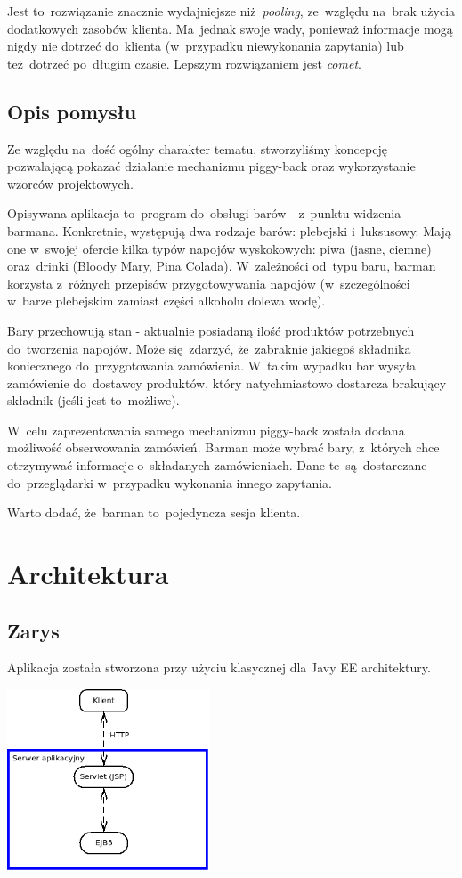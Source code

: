 \documentclass[11pt]{aghdpl}
\begin{document}
Jest to~rozwiązanie znacznie wydajniejsze niż~\textit{pooling}, ze~względu na~brak użycia dodatkowych zasobów klienta. Ma~jednak swoje wady, ponieważ informacje mogą nigdy nie dotrzeć do~klienta (w~przypadku niewykonania zapytania) lub też~dotrzeć po~długim czasie. Lepszym rozwiązaniem jest \textit{comet}.

\section{Opis pomysłu}
Ze względu na~dość ogólny charakter tematu, stworzyliśmy koncepcję pozwalającą pokazać działanie mechanizmu piggy-back oraz wykorzystanie wzorców projektowych.

Opisywana aplikacja to~program do~obsługi barów - z~punktu widzenia barmana. Konkretnie, występują dwa rodzaje barów: plebejski i~luksusowy. Mają one w~swojej ofercie kilka typów napojów wyskokowych: piwa (jasne, ciemne) oraz~drinki (Bloody Mary, Pina Colada). W~zależności od~typu baru, barman korzysta z~różnych przepisów przygotowywania napojów (w~szczególności w~barze plebejskim zamiast części alkoholu dolewa wodę). 

Bary przechowują stan - aktualnie posiadaną ilość produktów potrzebnych do~tworzenia napojów. Może się~zdarzyć, że~zabraknie jakiegoś składnika koniecznego do~przygotowania zamówienia. W~takim wypadku bar wysyła zamówienie do~dostawcy produktów, który natychmiastowo dostarcza brakujący składnik (jeśli jest to~możliwe). 

W~celu zaprezentowania samego mechanizmu piggy-back została dodana możliwość obserwowania zamówień. Barman może wybrać bary, z~których chce otrzymywać informacje o~składanych zamówieniach. Dane te~są~dostarczane do~przeglądarki w~przypadku wykonania innego zapytania.

Warto dodać, że~barman to~pojedyncza sesja klienta.
\chapter{Architektura}
\section{Zarys}
Aplikacja została stworzona przy użyciu klasycznej dla Javy EE architektury.

\begin{center}
 \includegraphics[width=6cm]{arch}
\end{center}
\end{document}
